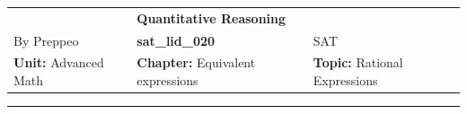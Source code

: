 \documentclass[11pt,paper=a4,answers]{exam}
\begin{document}
\begin{center}
    \centering
    \renewcommand{\arraystretch}{1.5}
    \begin{tabularx}{\textwidth}{YYY}
    & \normalsize\bf{{\Large{{Quantitative Reasoning}}}} & \\
    By Preppeo & \normalsize\bf{{sat\_lid\_020}} & SAT\\
    \normalsize{{\textbf{{Unit:}} Advanced Math}} & \normalsize{{\textbf{{Chapter:}} Equivalent expressions}} & \normalsize{{\textbf{{Topic:}} Rational Expressions}} \\
    \end{tabularx}
\end{center}
\par\noindent\rule{\textwidth}{1pt}
\end{document}
